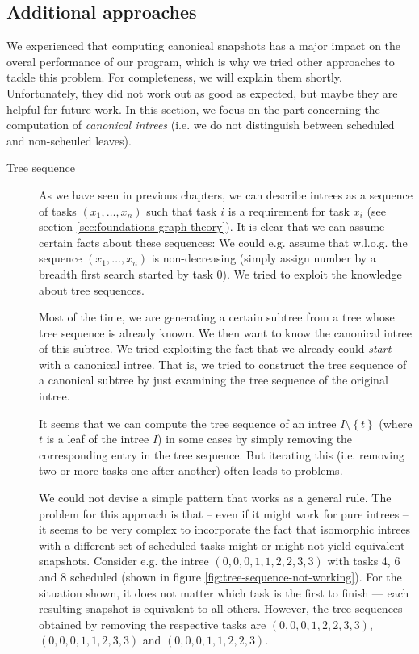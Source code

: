 \subsection{Additional approaches}
\label{sec:algorithm-canonical-snap-additional-approaches}

We experienced that computing canonical snapshots has a major impact on the overal performance of our program, which is why we tried other approaches to tackle this problem. For completeness, we will explain them shortly. Unfortunately, they did not work out as good as expected, but maybe they are helpful for future work. In this section, we focus on the part concerning the computation of \emph{canonical intrees} (i.e. we do not distinguish between scheduled and non-scheuled leaves).

\begin{description}
\item[Tree sequence] As we have seen in previous chapters, we can describe intrees as a sequence of tasks $(x_1,\dots,x_n)$ such that task $i$ is a requirement for task $x_i$ (see section \ref{sec:foundations-graph-theory}). It is clear that we can assume certain facts about these sequences: We could e.g. assume that w.l.o.g. the sequence $(x_1,\dots,x_n)$ is non-decreasing (simply assign number by a breadth first search started by task 0). We tried to exploit the knowledge about tree sequences.

Most of the time, we are generating a certain subtree from a tree whose tree sequence is already known. We then want to know the canonical intree of this subtree. We tried exploiting the fact that we already could \emph{start} with a canonical intree. That is, we tried to construct the tree sequence of a canonical subtree by just examining the tree sequence of the original intree. 

It seems that we can compute the tree sequence of an intree $I\setminus \left\{ t \right\}$ (where $t$ is a leaf of the intree $I$) in some cases by simply removing the corresponding entry in the tree sequence. But iterating this (i.e. removing two or more tasks one after another) often leads to problems.

We could not devise a simple pattern that works as a general rule. The problem for this approach is that -- even if it might work for pure intrees -- it seems to be very complex to incorporate the fact that isomorphic intrees with a different set of scheduled tasks might or might not yield equivalent snapshots. Consider e.g. the intree $(0,0,0,1,1,2,2,3,3)$ with tasks 4, 6 and 8 scheduled (shown in figure \ref{fig:tree-sequence-not-working}). For the situation shown, it does not matter which task is the first to finish --- each resulting snapshot is equivalent to all others. However, the tree sequences obtained by removing the respective tasks are $(0,0,0,1,2,2,3,3)$, $(0,0,0,1,1,2,3,3)$ and $(0,0,0,1,1,2,2,3)$.


\end{description}
